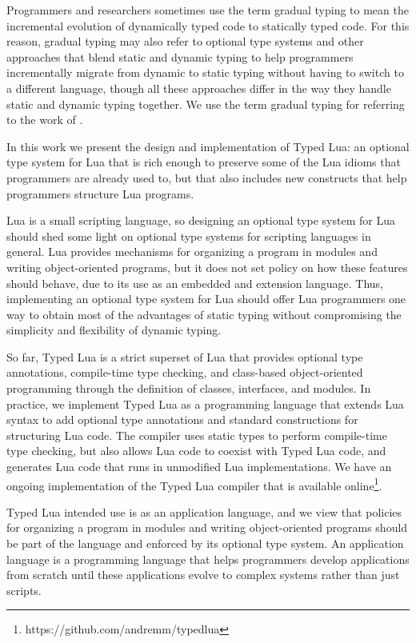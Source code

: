 Programmers and researchers sometimes use the term gradual typing
to mean the incremental evolution of dynamically typed code to
statically typed code.
For this reason, gradual typing may also refer to optional type
systems and other approaches that blend static and dynamic typing to
help programmers incrementally migrate from dynamic to static typing
without having to switch to a different language, though all these
approaches differ in the way they handle static and dynamic typing
together.
We use the term gradual typing for referring to the work of
\citet{siek2006gradual}.

In this work we present the design and implementation of Typed Lua:
an optional type system for Lua that is rich enough to
preserve some of the Lua idioms that programmers are already used to,
but that also includes new constructs that help programmers
structure Lua programs.

Lua is a small scripting language, so designing an optional type
system for Lua should shed some light on optional type systems for
scripting languages in general.
Lua provides mechanisms for organizing a program in modules and
writing object-oriented programs, but it does not set policy on how
these features should behave, due to its use as an embedded and
extension language.
Thus, implementing an optional type system for Lua should offer Lua
programmers one way to obtain most of the advantages of static typing
without compromising the simplicity and flexibility of dynamic typing.

So far, Typed Lua is a strict superset of Lua that
provides optional type annotations, compile-time type checking, and
class-based object-oriented programming through the definition of
classes, interfaces, and modules.
In practice, we implement Typed Lua as a programming language that
extends Lua syntax to add optional type annotations and standard
constructions for structuring Lua code.
The compiler uses static types to perform compile-time type
checking, but also allows Lua code to coexist with Typed Lua code,
and generates Lua code that runs in unmodified Lua implementations.
We have an ongoing implementation of the Typed Lua compiler that is
available online\footnote{https://github.com/andremm/typedlua}.

Typed Lua intended use is as an application language, and we view
that policies for organizing a program in modules and writing
object-oriented programs should be part of the language and
enforced by its optional type system.
An application language is a programming language that helps
programmers develop applications from scratch until these
applications evolve to complex systems rather than just scripts.

